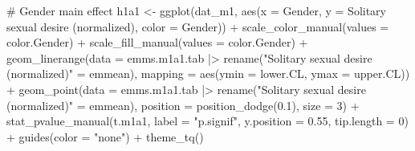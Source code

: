 \documentclass[
  bookmarksnumbered]{article}
\newenvironment{Shaded}{\begin{snugshade}}{\end{snugshade}}
\newcommand{\AttributeTok}[1]{\textcolor[rgb]{0.80,0.80,0.80}{#1}}
\newcommand{\CommentTok}[1]{\textcolor[rgb]{0.50,0.62,0.50}{#1}}
\newcommand{\DecValTok}[1]{\textcolor[rgb]{0.86,0.86,0.80}{#1}}
\newcommand{\FloatTok}[1]{\textcolor[rgb]{0.75,0.75,0.82}{#1}}
\newcommand{\FunctionTok}[1]{\textcolor[rgb]{0.94,0.94,0.56}{#1}}
\newcommand{\NormalTok}[1]{\textcolor[rgb]{0.80,0.80,0.80}{#1}}
\newcommand{\OtherTok}[1]{\textcolor[rgb]{0.94,0.94,0.56}{#1}}
\newcommand{\SpecialCharTok}[1]{\textcolor[rgb]{0.86,0.64,0.64}{#1}}
\newcommand{\StringTok}[1]{\textcolor[rgb]{0.80,0.58,0.58}{#1}}
\begin{document}
\begin{Shaded}
\begin{Highlighting}[]
\CommentTok{\# Gender main effect}
\NormalTok{h1a1 }\OtherTok{\textless{}{-}} \FunctionTok{ggplot}\NormalTok{(dat\_m1, }\FunctionTok{aes}\NormalTok{(}\AttributeTok{x =}\NormalTok{ Gender, }\AttributeTok{y =} \StringTok{\textasciigrave{}}\AttributeTok{Solitary sexual desire (normalized)}\StringTok{\textasciigrave{}}\NormalTok{, }
                          \AttributeTok{color =}\NormalTok{ Gender)) }\SpecialCharTok{+}
  \FunctionTok{scale\_color\_manual}\NormalTok{(}\AttributeTok{values =}\NormalTok{ color.Gender) }\SpecialCharTok{+}
  \FunctionTok{scale\_fill\_manual}\NormalTok{(}\AttributeTok{values =}\NormalTok{ color.Gender) }\SpecialCharTok{+}
  \FunctionTok{geom\_linerange}\NormalTok{(}\AttributeTok{data =}\NormalTok{ emms.m1a1.tab }\SpecialCharTok{|\textgreater{}} 
                  \FunctionTok{rename}\NormalTok{(}\StringTok{"Solitary sexual desire (normalized)"} \OtherTok{=}\NormalTok{ emmean),}
                \AttributeTok{mapping =} \FunctionTok{aes}\NormalTok{(}\AttributeTok{ymin =}\NormalTok{ lower.CL, }\AttributeTok{ymax =}\NormalTok{ upper.CL)) }\SpecialCharTok{+}
  \FunctionTok{geom\_point}\NormalTok{(}\AttributeTok{data =}\NormalTok{ emms.m1a1.tab }\SpecialCharTok{|\textgreater{}} 
                  \FunctionTok{rename}\NormalTok{(}\StringTok{"Solitary sexual desire (normalized)"} \OtherTok{=}\NormalTok{ emmean), }
             \AttributeTok{position =} \FunctionTok{position\_dodge}\NormalTok{(}\FloatTok{0.1}\NormalTok{), }
             \AttributeTok{size =} \DecValTok{3}\NormalTok{) }\SpecialCharTok{+}
  \FunctionTok{stat\_pvalue\_manual}\NormalTok{(t.m1a1, }
                     \AttributeTok{label =} \StringTok{"p.signif"}\NormalTok{, }
                     \AttributeTok{y.position =} \FloatTok{0.55}\NormalTok{, }
                     \AttributeTok{tip.length =} \DecValTok{0}\NormalTok{) }\SpecialCharTok{+}
  \FunctionTok{guides}\NormalTok{(}\AttributeTok{color =} \StringTok{"none"}\NormalTok{) }\SpecialCharTok{+}
  \FunctionTok{theme\_tq}\NormalTok{()}


\end{Highlighting}
\end{Shaded}
\end{document}
